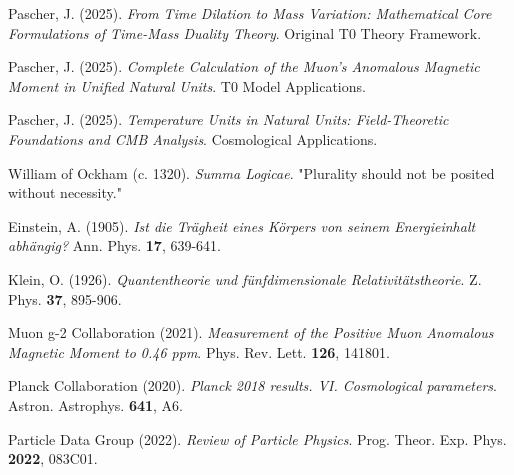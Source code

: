 \documentclass[12pt,a4paper]{article}
\theoremstyle{definition}
\theoremstyle{remark}
\begin{document}
	\begin{thebibliography}{99}
		Pascher, J. (2025). \textit{From Time Dilation to Mass Variation: Mathematical Core Formulations of Time-Mass Duality Theory}. Original T0 Theory Framework.
		
		Pascher, J. (2025). \textit{Complete Calculation of the Muon's Anomalous Magnetic Moment in Unified Natural Units}. T0 Model Applications.
		
		Pascher, J. (2025). \textit{Temperature Units in Natural Units: Field-Theoretic Foundations and CMB Analysis}. Cosmological Applications.
		
		William of Ockham (c. 1320). \textit{Summa Logicae}. "Plurality should not be posited without necessity."
		
		Einstein, A. (1905). \textit{Ist die Trägheit eines Körpers von seinem Energieinhalt abhängig?} Ann. Phys. \textbf{17}, 639-641.
		
		Klein, O. (1926). \textit{Quantentheorie und fünfdimensionale Relativitätstheorie}. Z. Phys. \textbf{37}, 895-906.
		
		Muon g-2 Collaboration (2021). \textit{Measurement of the Positive Muon Anomalous Magnetic Moment to 0.46 ppm}. Phys. Rev. Lett. \textbf{126}, 141801.
		
		Planck Collaboration (2020). \textit{Planck 2018 results. VI. Cosmological parameters}. Astron. Astrophys. \textbf{641}, A6.
		
		Particle Data Group (2022). \textit{Review of Particle Physics}. Prog. Theor. Exp. Phys. \textbf{2022}, 083C01.
	\end{thebibliography}
	
\end{document}
